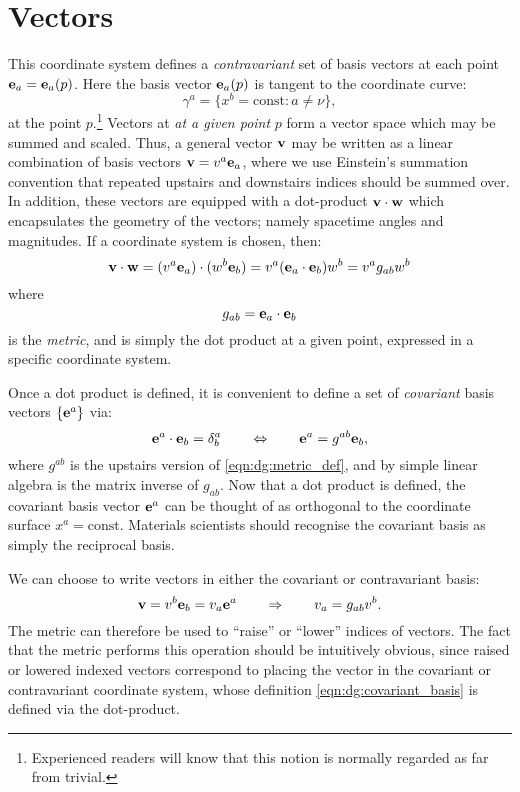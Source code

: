 \section{Vectors}
This coordinate system defines a {\em contravariant\/} set of basis vectors at each point $\mathbf{e}_a = \mathbf{e}_a(p)$. Here the basis vector $\mathbf{e}_a(p)$ is tangent to the coordinate curve:
\begin{equation}
  \gamma^a = \{x^b=\mathrm{const} : a\ne \nu\},
  \label{eqn:dg:coordinate_curve}
\end{equation}
at the point $p$.\footnote{Experienced readers will know that this notion is normally regarded as far from trivial.}
  Vectors at {\em at a given point\/} $p$ form a vector space which may be summed and scaled. Thus, a general vector $\mathbf{v}$ may be written as a linear combination of basis vectors $\mathbf{v} = v^a \mathbf{e}_a$, where we use Einstein's summation convention that repeated upstairs and downstairs indices should be summed over. In addition, these vectors are equipped with a dot-product $\mathbf{v}\cdot\mathbf{w}$ which encapsulates the geometry of the vectors; namely spacetime angles and magnitudes. If a coordinate system is chosen, then:
\begin{equation}
  \mathbf{v}\cdot\mathbf{w} = (v^a\mathbf{e}_a)\cdot(w^b\mathbf{e}_b) = v^a (\mathbf{e}_a\cdot\mathbf{e}_b)w^b =  v^a g_{ab} w^b
  \label{eqn:dg:dot_product}
\end{equation}
where 
\begin{equation}
  g_{ab} = \mathbf{e}_a\cdot\mathbf{e}_b
  \label{eqn:dg:metric_def}
\end{equation}
is the {\em metric}, and is simply the dot product at a given point, expressed in a specific coordinate system.

Once a dot product is defined, it is convenient to define a set of {\em covariant\/} basis vectors $\{\mathbf{e}^a\}$ via:
\begin{equation}
  \mathbf{e}^a \cdot \mathbf{e}_b = \delta^a_b 
  \qquad\Leftrightarrow\qquad
  \mathbf{e}^a = g^{ab} \mathbf{e}_b,
  \label{eqn:dg:covariant_basis}
\end{equation}
where $g^{ab}$ is the upstairs version of \eqref{eqn:dg:metric_def}, and by simple linear algebra is the matrix inverse of $g_{ab}$. Now that a dot product is defined, the covariant basis vector $\mathbf{e}^a$ can be thought of as orthogonal to the coordinate surface $x^a=\mathrm{const}$. Materials scientists should recognise the covariant basis as simply the reciprocal basis. 

We can choose to write vectors in either the covariant or contravariant basis:
\begin{equation}
  \mathbf{v}=v^b \mathbf{e}_b = v_a \mathbf{e}^a 
  \qquad\Rightarrow\qquad
  v_a = g_{ab} v^b.
  \label{eqn:dg:covariant_vector}
\end{equation}
The metric can therefore be used to ``raise'' or ``lower'' indices of vectors. The fact that the metric performs this operation should be intuitively obvious, since raised or lowered indexed vectors correspond to placing the vector in the covariant or contravariant coordinate system, whose definition \eqref{eqn:dg:covariant_basis} is defined via the dot-product.

